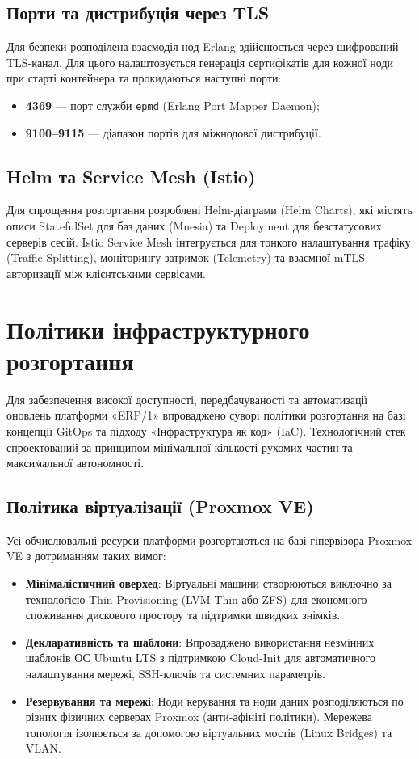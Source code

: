 \documentclass{article}
\begin{document}
\subsection{Порти та дистрибуція через TLS}
Для безпеки розподілена взаємодія нод Erlang здійснюється через шифрований TLS-канал. Для цього налаштовується генерація сертифікатів для кожної ноди при старті контейнера та прокидаються наступні порти:
\begin{itemize}
    \item \textbf{4369} --- порт служби \texttt{epmd} (Erlang Port Mapper Daemon);
    \item \textbf{9100--9115} --- діапазон портів для міжнодової дистрибуції.
\end{itemize}

\subsection{Helm та Service Mesh (Istio)}
 
Для спрощення розгортання розроблені Helm-діаграми (Helm Charts), які містять описи StatefulSet для баз даних (Mnesia) та Deployment для безстатусових серверів сесій. Istio Service Mesh інтегрується для тонкого налаштування трафіку (Traffic Splitting), моніторингу затримок (Telemetry) та взаємної mTLS авторизації між клієнтськими сервісами.

\section{Політики інфраструктурного розгортання}
    
Для забезпечення високої доступності, передбачуваності та автоматизації оновлень платформи «ERP/1» впроваджено суворі політики розгортання на базі концепції GitOps та підходу «Інфраструктура як код» (IaC). Технологічний стек спроектований за принципом мінімальної кількості рухомих частин та максимальної автономності.

\subsection{Політика віртуалізації (Proxmox VE)}
Усі обчислювальні ресурси платформи розгортаються на базі гіпервізора Proxmox VE з дотриманням таких вимог:
\begin{itemize}
    \item \textbf{Мінімалістичний оверхед}: Віртуальні машини створюються виключно за технологією Thin Provisioning (LVM-Thin або ZFS) для економного споживання дискового простору та підтримки швидких знімків.
    \item \textbf{Декларативність та шаблони}: Впроваджено використання незмінних шаблонів ОС Ubuntu LTS з підтримкою Cloud-Init для автоматичного налаштування мережі, SSH-ключів та системних параметрів.
    \item \textbf{Резервування та мережі}: Ноди керування та ноди даних розподіляються по різних фізичних серверах Proxmox (анти-афініті політики). Мережева топологія ізолюється за допомогою віртуальних мостів (Linux Bridges) та VLAN.
\end{itemize}
\end{document}
